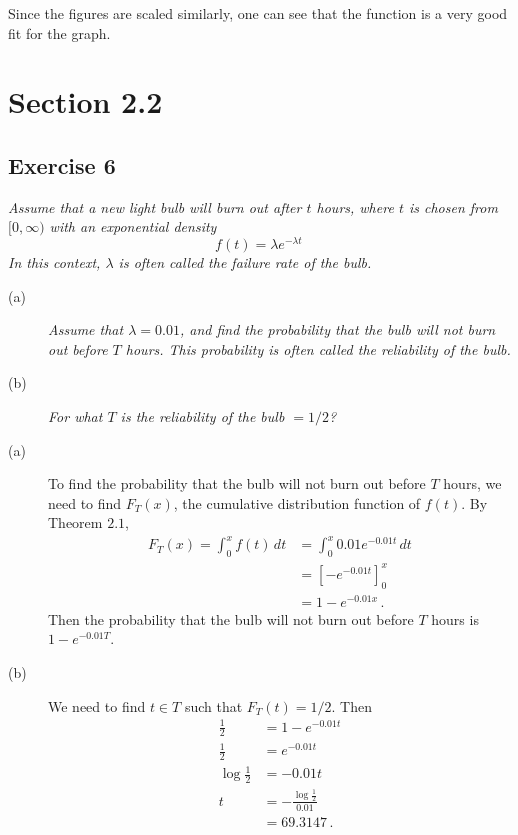 \documentclass{tufte-handout}
\begin{document}
Since the figures are scaled similarly, one can see that the function
is a very good fit for the graph.

\section{Section 2.2}
\subsection{Exercise 6}
\begin{description}
\item \emph{Assume that a new light bulb will burn out after $t$
    hours, where $t$ is chosen from $[0,\infty)$ with an exponential
    density \[ f(t) = \lambda e^{-\lambda t} \, \]
    In this context, $\lambda$ is often called the \emph{failure
      rate} of the bulb.}
  \begin{description}
  \item [(a)] \emph{Assume that $\lambda = 0.01$, and find the probability
    that the bulb will \emph{not} burn out before $T$ hours. This
    probability is often called the \emph{reliability} of the bulb.}
  \item [(b)] \emph{For what $T$ is the reliability of the bulb $= 1/2$?}
  \end{description}
\end{description}

\begin{description}
\item [(a)] To find the probability that the bulb will not burn out
  before $T$ hours, we need to find $F_T(x)$, the cumulative distribution
  function of $f(t)$. By Theorem $2.1$,
  \begin{align*}
    F_T(x) = \int_{0}^x \! f(t) \, dt &= \int_{0}^x \!
    0.01 e^{-0.01 t} \, dt \\
    &= \left[ -e^{-0.01t} \right]_0^x \\
    &= 1 - e^{-0.01x} \, .
  \end{align*}
  Then the probability that the bulb will not burn out before $T$
  hours is $1-e^{-0.01T}$.
\item [(b)] We need to find $t \in T$ such that $F_T(t) = 1/2$. Then
  \begin{align*}
    \frac{1}{2} &= 1 - e^{-0.01t} \\
    \frac{1}{2} &= e^{-0.01t} \\
    \log{\frac{1}{2}} &= -0.01t \\
    t &= -\frac{\log{\frac{1}{2}}}{0.01} \\
    &= 69.3147 \, .
  \end{align*}
\end{description}
\end{document}
